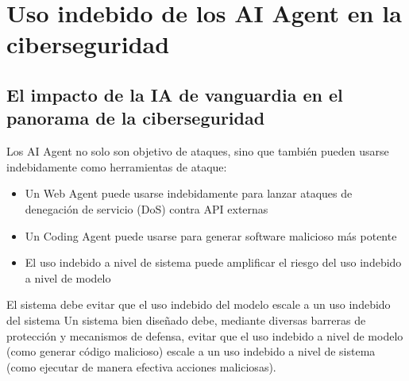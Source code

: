 \section{Uso indebido de los AI Agent en la ciberseguridad}

\subsection{El impacto de la IA de vanguardia en el panorama de la ciberseguridad}

Los AI Agent no solo son objetivo de ataques, sino que también pueden usarse indebidamente como herramientas de ataque:
\begin{itemize}
    \item Un Web Agent puede usarse indebidamente para lanzar ataques de denegación de servicio (DoS) contra API externas
    \item Un Coding Agent puede usarse para generar software malicioso más potente
    \item El uso indebido a nivel de sistema puede amplificar el riesgo del uso indebido a nivel de modelo
\end{itemize}

\begin{warningbox}{El sistema debe evitar que el uso indebido del modelo escale a un uso indebido del sistema}
Un sistema bien diseñado debe, mediante diversas barreras de protección y mecanismos de defensa, evitar que el uso indebido a nivel de modelo (como generar código malicioso) escale a un uso indebido a nivel de sistema (como ejecutar de manera efectiva acciones maliciosas).
\end{warningbox}

